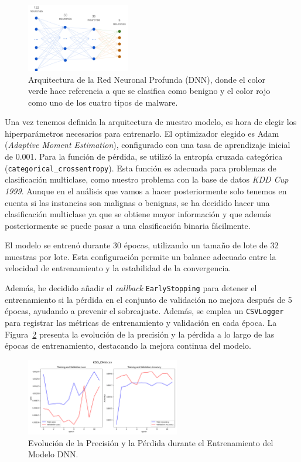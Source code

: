 \begin{figure}[h]
    \centering
    \includegraphics[width=0.4\textwidth]{img/kddDNN.png}
    \caption{Arquitectura de la Red Neuronal Profunda (DNN), donde el color verde hace referencia a que se clasifica como benigno y el color rojo como uno de los cuatro tipos de malware.}
    \label{fig:kddDNN}
\end{figure}

Una vez tenemos definida la arquitectura de nuestro modelo, es hora de elegir los hiperparámetros necesarios para entrenarlo. El optimizador elegido es Adam (\textit{Adaptive Moment Estimation}), configurado con una tasa de aprendizaje inicial de 0.001. Para la función de pérdida, se utilizó la entropía cruzada categórica (\lstinline|categorical_crossentropy|). Esta función es adecuada para problemas de clasificación multiclase, como nuestro problema con la base de datos \textit{KDD Cup 1999}. Aunque en el análisis que vamos a hacer posteriormente solo tenemos en cuenta si las instancias son malignas o benignas, se ha decidido hacer una clasificación multiclase ya que se obtiene mayor información y que además posteriormente se puede pasar a una clasificación binaria fácilmente. 

El modelo se entrenó durante 30 épocas, utilizando un tamaño de lote de 32 muestras por lote. Esta configuración permite un balance adecuado entre la velocidad de entrenamiento y la estabilidad de la convergencia. 

Además, he decidido añadir el \textit{callback} \lstinline|EarlyStopping| para detener el entrenamiento si la pérdida en el conjunto de validación no mejora después de 5 épocas, ayudando a prevenir el sobreajuste. Además, se emplea un \lstinline|CSVLogger| para registrar las métricas de entrenamiento y validación en cada época. La Figura~\ref{fig:kdd_dnn} presenta la evolución de la precisión y la pérdida a lo largo de las épocas de entrenamiento, destacando la mejora continua del modelo.

\begin{figure}[h]
    \centering
    \includegraphics[width=0.6\textwidth]{img/KDD_DNN.csv.png}
    \caption{Evolución de la Precisión y la Pérdida durante el Entrenamiento del Modelo DNN.}
    \label{fig:kdd_dnn}
\end{figure}

